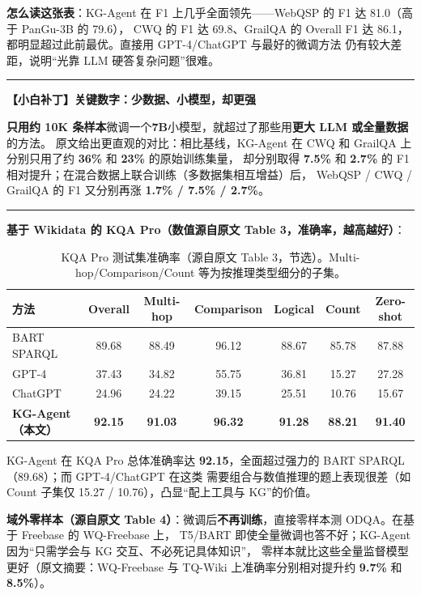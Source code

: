 \documentclass[11pt,UTF8,fontset=fandol]{ctexart}
\newenvironment{tip}[1]{%
  \par\smallskip\noindent\rule{\linewidth}{0.4pt}\par\nobreak
  \noindent\textbf{【小白补丁】#1}\par\nobreak\noindent\ignorespaces
}{%
  \par\noindent\rule{\linewidth}{0.4pt}\par\smallskip
}
\begin{document}
\textbf{怎么读这张表}：KG-Agent 在 F1 上几乎全面领先——WebQSP 的 F1 达 81.0（高于 PanGu-3B 的 79.6），
CWQ 的 F1 达 69.8、GrailQA 的 Overall F1 达 86.1，都明显超过此前最优。直接用 GPT-4/ChatGPT 与最好的微调方法
仍有较大差距，说明“光靠 LLM 硬答复杂问题”很难。

\begin{tip}{关键数字：少数据、小模型，却更强}
\textbf{只用约 10K 条样本}微调一个\textbf{7B}小模型，就超过了那些用\textbf{更大 LLM 或全量数据}的方法。
原文给出更直观的对比：相比基线，KG-Agent 在 CWQ 和 GrailQA 上分别只用了约 \textbf{36\%} 和 \textbf{23\%} 的原始训练集量，
却分别取得 \textbf{7.5\%} 和 \textbf{2.7\%} 的 F1 相对提升；在混合数据上联合训练（多数据集相互增益）后，
WebQSP / CWQ / GrailQA 的 F1 又分别再涨 \textbf{1.7\% / 7.5\% / 2.7\%}。
\end{tip}

\textbf{基于 Wikidata 的 KQA Pro（数值源自原文 Table 3，准确率，越高越好）}：

\begin{table}[H]\centering
\caption{KQA Pro 测试集准确率（源自原文 Table 3，节选）。Multi-hop/Comparison/Count 等为按推理类型细分的子集。}
\begin{tabular}{lcccccc}
\toprule
\textbf{方法} & Overall & Multi-hop & Comparison & Logical & Count & Zero-shot \\
\midrule
BART SPARQL  & 89.68 & 88.49 & 96.12 & 88.67 & 85.78 & 87.88 \\
GPT-4        & 37.43 & 34.82 & 55.75 & 36.81 & 15.27 & 27.28 \\
ChatGPT      & 24.96 & 24.22 & 39.15 & 25.51 & 10.76 & 15.67 \\
\textbf{KG-Agent（本文）} & \textbf{92.15} & \textbf{91.03} & \textbf{96.32} & \textbf{91.28} & \textbf{88.21} & \textbf{91.40} \\
\bottomrule
\end{tabular}
\end{table}

KG-Agent 在 KQA Pro 总体准确率达 \textbf{92.15}，全面超过强力的 BART SPARQL（89.68）；而 GPT-4/ChatGPT 在这类
需要组合与数值推理的题上表现很差（如 Count 子集仅 15.27 / 10.76），凸显“配上工具与 KG”的价值。

\textbf{域外零样本（源自原文 Table 4）}：微调后\textbf{不再训练}，直接零样本测 ODQA。在基于 Freebase 的 WQ-Freebase 上，
T5/BART 即使全量微调也答不好；KG-Agent 因为“只需学会与 KG 交互、不必死记具体知识”，
零样本就比这些全量监督模型更好（原文摘要：WQ-Freebase 与 TQ-Wiki 上准确率分别相对提升约 \textbf{9.7\%} 和 \textbf{8.5\%}）。
\end{document}
